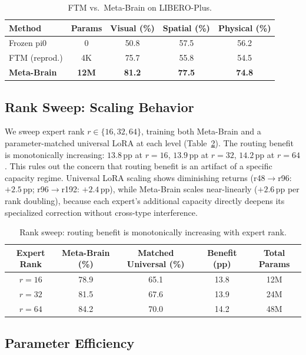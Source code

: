 \documentclass[10pt,twocolumn]{article}
\newcommand{\ours}{Meta-Brain}
\newcommand{\liplus}{LIBERO-Plus}
\newcommand{\pp}{\,\text{pp}}
\begin{document}
\begin{table}[t]
\centering
\caption{FTM vs.\ \ours{} on \liplus{}.}
\label{tab:ftm}
\small
\begin{tabular}{@{}lcccc@{}}
\toprule
Method & Params & Visual (\%) & Spatial (\%) & Physical (\%) \\
\midrule
Frozen pi0 & 0 & 50.8 & 57.5 & 56.2 \\
FTM (reprod.) & 4K & 75.7 & 55.8 & 54.5 \\
\textbf{\ours{}} & \textbf{12M} & \textbf{81.2} & \textbf{77.5} & \textbf{74.8} \\
\bottomrule
\end{tabular}
\end{table}


\subsection{Rank Sweep: Scaling Behavior}
\label{sec:rank_sweep}

We sweep expert rank $r \in \{16, 32, 64\}$, training both \ours{} and a parameter-matched universal LoRA at each level (Table~\ref{tab:rank_sweep}).
The routing benefit is monotonically increasing: $13.8\pp$ at $r{=}16$, $13.9\pp$ at $r{=}32$, $14.2\pp$ at $r{=}64$.
This rules out the concern that routing benefit is an artifact of a specific capacity regime.
Universal LoRA scaling shows diminishing returns (r48$\to$r96: $+2.5\pp$; r96$\to$r192: $+2.4\pp$), while \ours{} scales near-linearly ($+2.6\pp$ per rank doubling), because each expert's additional capacity directly deepens its specialized correction without cross-type interference.

\begin{table}[t]
\centering
\caption{Rank sweep: routing benefit is monotonically increasing with expert rank.}
\label{tab:rank_sweep}
\small
\begin{tabular}{@{}ccccc@{}}
\toprule
Expert Rank & \ours{} (\%) & Matched Universal (\%) & Benefit (pp) & Total Params \\
\midrule
$r{=}16$ & 78.9 & 65.1 & 13.8 & 12M \\
$r{=}32$ & 81.5 & 67.6 & 13.9 & 24M \\
$r{=}64$ & 84.2 & 70.0 & 14.2 & 48M \\
\bottomrule
\end{tabular}
\end{table}


\subsection{Parameter Efficiency}
\label{sec:param_efficiency}
\end{document}

